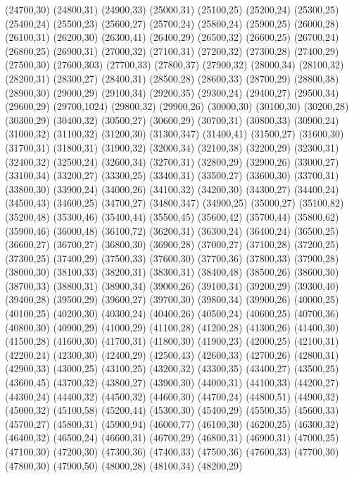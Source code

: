 (24700,30)
(24800,31)
(24900,33)
(25000,31)
(25100,25)
(25200,24)
(25300,25)
(25400,24)
(25500,23)
(25600,27)
(25700,24)
(25800,24)
(25900,25)
(26000,28)
(26100,31)
(26200,30)
(26300,41)
(26400,29)
(26500,32)
(26600,25)
(26700,24)
(26800,25)
(26900,31)
(27000,32)
(27100,31)
(27200,32)
(27300,28)
(27400,29)
(27500,30)
(27600,303)
(27700,33)
(27800,37)
(27900,32)
(28000,34)
(28100,32)
(28200,31)
(28300,27)
(28400,31)
(28500,28)
(28600,33)
(28700,29)
(28800,38)
(28900,30)
(29000,29)
(29100,34)
(29200,35)
(29300,24)
(29400,27)
(29500,34)
(29600,29)
(29700,1024)
(29800,32)
(29900,26)
(30000,30)
(30100,30)
(30200,28)
(30300,29)
(30400,32)
(30500,27)
(30600,29)
(30700,31)
(30800,33)
(30900,24)
(31000,32)
(31100,32)
(31200,30)
(31300,347)
(31400,41)
(31500,27)
(31600,30)
(31700,31)
(31800,31)
(31900,32)
(32000,34)
(32100,38)
(32200,29)
(32300,31)
(32400,32)
(32500,24)
(32600,34)
(32700,31)
(32800,29)
(32900,26)
(33000,27)
(33100,34)
(33200,27)
(33300,25)
(33400,31)
(33500,27)
(33600,30)
(33700,31)
(33800,30)
(33900,24)
(34000,26)
(34100,32)
(34200,30)
(34300,27)
(34400,24)
(34500,43)
(34600,25)
(34700,27)
(34800,347)
(34900,25)
(35000,27)
(35100,82)
(35200,48)
(35300,46)
(35400,44)
(35500,45)
(35600,42)
(35700,44)
(35800,62)
(35900,46)
(36000,48)
(36100,72)
(36200,31)
(36300,24)
(36400,24)
(36500,25)
(36600,27)
(36700,27)
(36800,30)
(36900,28)
(37000,27)
(37100,28)
(37200,25)
(37300,25)
(37400,29)
(37500,33)
(37600,30)
(37700,36)
(37800,33)
(37900,28)
(38000,30)
(38100,33)
(38200,31)
(38300,31)
(38400,48)
(38500,26)
(38600,30)
(38700,33)
(38800,31)
(38900,34)
(39000,26)
(39100,34)
(39200,29)
(39300,40)
(39400,28)
(39500,29)
(39600,27)
(39700,30)
(39800,34)
(39900,26)
(40000,25)
(40100,25)
(40200,30)
(40300,24)
(40400,26)
(40500,24)
(40600,25)
(40700,36)
(40800,30)
(40900,29)
(41000,29)
(41100,28)
(41200,28)
(41300,26)
(41400,30)
(41500,28)
(41600,30)
(41700,31)
(41800,30)
(41900,23)
(42000,25)
(42100,31)
(42200,24)
(42300,30)
(42400,29)
(42500,43)
(42600,33)
(42700,26)
(42800,31)
(42900,33)
(43000,25)
(43100,25)
(43200,32)
(43300,35)
(43400,27)
(43500,25)
(43600,45)
(43700,32)
(43800,27)
(43900,30)
(44000,31)
(44100,33)
(44200,27)
(44300,24)
(44400,32)
(44500,32)
(44600,30)
(44700,24)
(44800,51)
(44900,32)
(45000,32)
(45100,58)
(45200,44)
(45300,30)
(45400,29)
(45500,35)
(45600,33)
(45700,27)
(45800,31)
(45900,94)
(46000,77)
(46100,30)
(46200,25)
(46300,32)
(46400,32)
(46500,24)
(46600,31)
(46700,29)
(46800,31)
(46900,31)
(47000,25)
(47100,30)
(47200,30)
(47300,36)
(47400,33)
(47500,36)
(47600,33)
(47700,30)
(47800,30)
(47900,50)
(48000,28)
(48100,34)
(48200,29)
